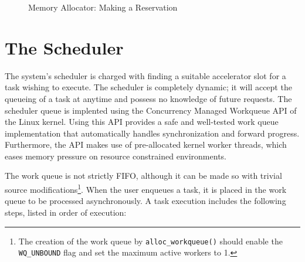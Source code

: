 \begin{figure}[htb!]
\caption{Memory Allocator: Making a Reservation}
\label{fig:allocator-reservation}
\end{figure}


\section{The Scheduler}

The system's scheduler is charged with finding a suitable accelerator slot 
for a task wishing to execute. The scheduler is completely dynamic; it
will accept the queueing of a task at anytime and possess no knowledge
of future requests. The scheduler queue is implented using the 
Concurrency Managed Workqueue API of the Linux kernel.
Using this API provides a safe and well-tested work queue implementation
that automatically handles synchronization and forward progress.
Furthermore, the API makes use of pre-allocated kernel worker threads,
which eases memory pressure on resource constrained environments.

The work queue is not strictly FIFO, although it can be made so with trivial source
modifications\footnote{The creation of the work queue by \texttt{alloc\_workqueue()}
should enable the \texttt{WQ\_UNBOUND} flag and set the maximum active workers to 1.}.
When the user enqueues a task, it is placed in the work queue to be processed asynchronously.
A task execution includes the following steps, listed in order of execution:

